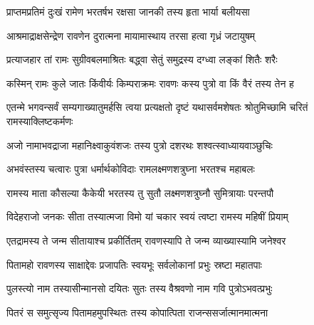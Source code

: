 
\translink{}



\twolineshloka
{प्राप्तमप्रतिमं दुःखं रामेण भरतर्षभ}
{रक्षसा जानकी तस्य हृता भार्या बलीयसा}


\twolineshloka
{आश्रमाद्राक्षसेन्द्रेण रावणेन दुरात्मना}
{मायामास्थाय तरसा हत्वा गृध्रं जटायुषम्}


\twolineshloka
{प्रत्याजहार तां रामः सुग्रीवबलमाश्रितः}
{बद्ध्वा सेतुं समुद्रस्य दग्ध्वा लङ्कां शितैः शरैः}



\twolineshloka
{कस्मिन् रामः कुले जातः किंवीर्यः किम्पराक्रमः}
{रावणः कस्य पुत्रो वा किं वैरं तस्य तेन ह}


\threelineshloka
{एतन्मे भगवन्सर्वं सम्यगाख्यातुमर्हसि}
{त्वया प्रत्यक्षतो दृष्टं यथासर्वमशेषतः}
{श्रोतुमिच्छामि चरितं रामस्याक्लिष्टकर्मणः}



\twolineshloka
{अजो नामाभवद्राजा महानिक्ष्वाकुवंशजः}
{तस्य पुत्रो दशरथः शश्वत्स्वाध्यायवाञ्छुचिः}


\twolineshloka
{अभवंस्तस्य चत्वारः पुत्रा धर्मार्थकोविदाः}
{रामलक्ष्मणशत्रुघ्ना भरतश्च महाबलः}


\twolineshloka
{रामस्य माता कौसल्या कैकेयी भरतस्य तु}
{सुतौ लक्ष्मणशत्रुघ्नौ सुमित्रायाः परन्तपौ}


\twolineshloka
{विदेहराजो जनकः सीता तस्यात्मजा विमो}
{यां चकार स्वयं त्वष्टा रामस्य महिषीं प्रियाम्}


\twolineshloka
{एतद्रामस्य ते जन्म सीतायाश्च प्रकीर्तितम्}
{रावणस्यापि ते जन्म व्याख्यास्यामि जनेश्वर}


\twolineshloka
{पितामहो रावणस्य साक्षाद्देवः प्रजापतिः}
{स्वयभूः सर्वलोकानां प्रभुः स्रष्टा महातपाः}


\twolineshloka
{पुलस्त्यो नाम तस्यासीन्मानसो दयितः सुतः}
{तस्य वैश्रवणो नाम गवि पुत्रोऽभवत्प्रभुः}


\twolineshloka
{पितरं स समुत्सृज्य पितामहमुपस्थितः}
{तस्य कोपात्पिता राजन्ससर्जात्मानमात्मना}


